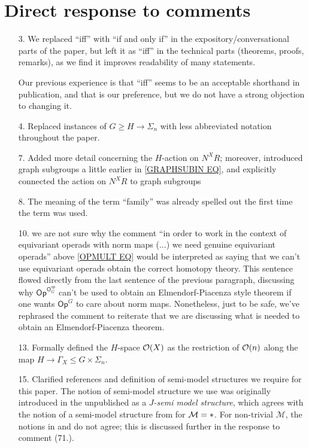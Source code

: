 \documentclass{article}
\begin{document}
\section{Direct response to comments}

\begin{itemize}
	\item[3.] We replaced ``iff'' with ``if and only if''
	in the expository/conversational parts of the paper, 
	but left it as ``iff'' in the technical parts (theorems, proofs, remarks), as we find it improves readability of many statements.
	
	Our previous experience is that ``iff'' seems to be an acceptable shorthand in publication, and that is our preference,
	but we do not have a strong objection to changing it.


        \item[4.] Replaced instances of $G \geq H \to \Sigma_n$ with less abbreviated notation throughout the paper.
        
      
	\item[7.] Added more detail concerning the 
	$H$-action on $N^X R$;
	moreover, introduced graph subgroups a little earlier in
	\eqref{GRAPHSUBIN EQ},
	and explicitly connected the action on 
	$N^X R$ to graph subgroups
	
	\item[8.] The meaning of the term ``family''
	was already spelled out the first time the term was used.

	\item[10.] we are not sure why the comment 
	``in order to work in the context of equivariant operads with norm maps (...) we need genuine equivariant operads''
	above \eqref{OPMULT EQ}
	would be interpreted as saying that we can't use equivariant operads obtain the correct homotopy theory.
	This sentence flowed directly from the last sentence of the previous paragraph, discussing why
	$\mathsf{Op}^{\mathsf{O}_G^{op}}$
	can't be used to obtain an Elmendorf-Piacenza style theorem if one wants $\mathsf{Op}^G$ to care about norm maps.
	Nonetheless, just to be safe, we've rephrased the comment to reiterate that we are discussing what is needed to obtain
	an Elmendorf-Piacenza theorem.

  \item[13.] Formally defined the $H$-space $\mathcal{O}(X)$ as the restriction of $\mathcal{O}(n)$ along the map $H \to \Gamma_X \leq G \times \Sigma_n$.
        
	\item[15.] Clarified references and definition of semi-model structures we require for this paper.
	The notion of semi-model structure we use was originally introduced in the unpublished \cite{Spi01} as a \textit{$J$-semi model structure},
	which agrees with the notion of a semi-model structure from \cite{WY18} for $\mathcal M = \**$.
	For non-trivial $\mathcal M$, the notions in \cite{Spi01} and \cite{WY18} do not agree;
	this is discussed further in the response to comment (71.).
	

\end{itemize}
\end{document}
